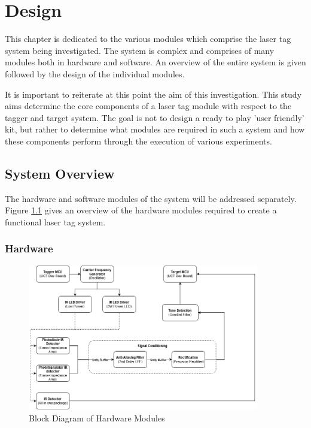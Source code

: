 \chapter{Design}
\label{ch_design}

This chapter is dedicated to the various modules which comprise the laser tag system being investigated. The system is complex and comprises of many modules both in hardware and software. An overview of the entire system is given followed by the design of the individual modules.

It is important to reiterate at this point the aim of this investigation. This study aims determine the core components of a laser tag module with respect to the tagger and target system. The goal is not to design a ready to play 'user friendly' kit, but rather to determine what modules are required in such a system and how these components perform through the execution of various experiments.

\section{System Overview}

The hardware and software modules of the system will be addressed separately. Figure \ref{fig:system_overview_hardware} gives an overview of the hardware modules required to create a functional laser tag system.

\subsection{Hardware}

\begin{figure}[H]
	\centering
	\includegraphics[width=0.9\textwidth]{figures/design/system_overview_hardware}
	\caption{Block Diagram of Hardware Modules}
	\label{fig:system_overview_hardware}
\end{figure}

